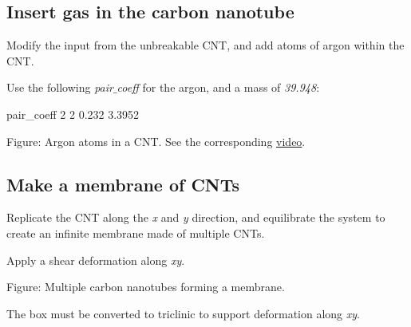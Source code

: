 \subsection{Insert gas in the carbon nanotube}
\noindent Modify the input from the unbreakable CNT, and add atoms of argon
within the CNT. 

\vspace{0.25cm} \noindent Use the following \textit{pair$\_$coeff} for the argon,
and a mass of \textit{39.948}:

\begin{lcverbatim}
pair_coeff 2 2 0.232 3.3952 
\end{lcverbatim}

Figure: Argon atoms in a CNT.  See the corresponding \href{https://www.youtube.com/watch?v=J4z_fZK7ekA}{video}.

\subsection{Make a membrane of CNTs}
\noindent Replicate the CNT along the \textit{x}
and \textit{y} direction, and equilibrate the system to 
create an infinite membrane made of multiple CNTs. 

\vspace{0.25cm} \noindent Apply a shear deformation along \textit{xy}.

\vspace{0.25cm} Figure: Multiple carbon nanotubes forming a membrane.  

\begin{tcolorbox}[colback=mylightblue!5!white,colframe=mylightblue!75!black,title=Hint]

\vspace{0.25cm} \noindent The box must be converted to triclinic to support deformation
along \textit{xy}.
\end{tcolorbox}

